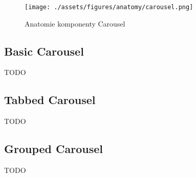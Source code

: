 \begin{figure}[htp]
    \centering
    \texttt{[image: ./assets/figures/anatomy/carousel.png]}
    \captionsetup{justification=centering}
    \caption{Anatomie komponenty Carousel}
\end{figure}

\subsection{Basic Carousel}

TODO

\subsection{Tabbed Carousel}

TODO

\subsection{Grouped Carousel}

TODO
